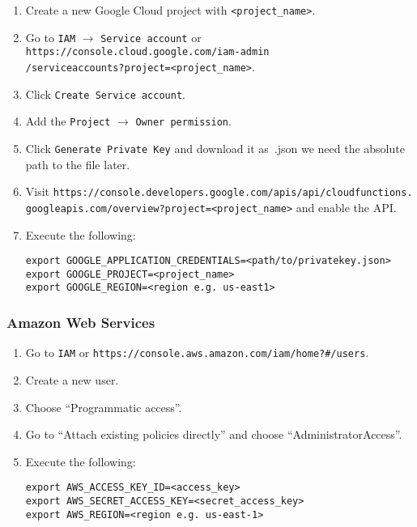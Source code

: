 \documentclass[../main.tex]{subfiles}
\begin{document}
\begin{enumerate}
\item Create a new Google Cloud project with \texttt{<project\_name>}.
\item Go to \texttt{IAM} $\rightarrow$ \texttt{Service account} or \texttt{https://console.cloud.google.com/iam-admin\\
  /serviceaccounts?project=<project\_name>}.
\item Click \texttt{Create Service account}.
\item Add the \texttt{Project} $\rightarrow$ \texttt{Owner permission}. %
\item Click \texttt{Generate Private Key} and download it as~.json we need the absolute path to the file later.
\item Visit \texttt{https://console.developers.google.com/apis/api/cloudfunctions.\\
  googleapis.com/overview?project=<project\_name>} and enable the API.\@
\item Execute the following: 
  \begin{tcolorbox}
    \texttt{export GOOGLE\_APPLICATION\_CREDENTIALS=<path/to/privatekey.json>}\\
    \texttt{export GOOGLE\_PROJECT=<project\_name>}\\
    \texttt{export GOOGLE\_REGION=<region e.g. us-east1>}
  \end{tcolorbox}
\end{enumerate}

\subsubsection{Amazon Web Services}\label{sec:providersetupaws}
\begin{enumerate}
\item Go to \texttt{IAM} or \texttt{https://console.aws.amazon.com/iam/home?\#/users}.
\item Create a new user.
\item Choose ``Programmatic access''.
\item Go to ``Attach existing policies directly'' and choose ``AdministratorAccess''.
\item Execute the following: 
  \begin{tcolorbox}
    \texttt{export AWS\_ACCESS\_KEY\_ID=<access\_key>}\\
    \texttt{export AWS\_SECRET\_ACCESS\_KEY=<secret\_access\_key>}\\
    \texttt{export AWS\_REGION=<region e.g. us-east-1>}
  \end{tcolorbox}
\end{enumerate}
\end{document}
